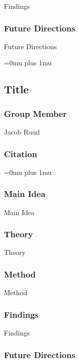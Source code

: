 \noindent
Findings

\subsubsection{Future Directions}

\noindent
Future Directions 

\Urlmuskip=0mu plus 1mu\relax

\noindent
\subsection{Title}

\subsubsection{Group Member}

\noindent
Jacob Ruud

\noindent
\subsubsection{Citation}

\Urlmuskip=0mu plus 1mu\relax

\subsubsection{Main Idea}

\noindent
Main Idea

\subsubsection{Theory}

\noindent
Theory

\subsubsection{Method}

\noindent
Method

\subsubsection{Findings}

\noindent
Findings

\subsubsection{Future Directions}

